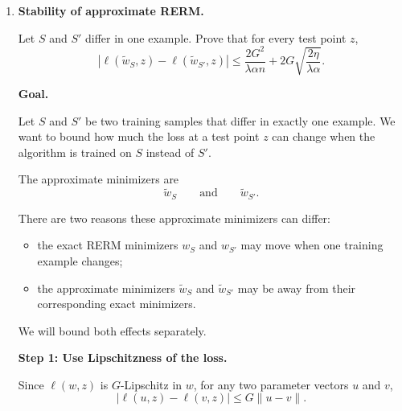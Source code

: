 \documentclass[11pt]{article}
\begin{document}
\begin{enumerate}
\begin{solutionbox}
Subtract \(F_S(w_S)\) from both sides:
\[
\frac{\lambda\alpha}{2}
\|\widetilde w_S-w_S\|^2
\le
\eta.
\]

Multiply both sides by \(\frac{2}{\lambda\alpha}\):
\[
\|\widetilde w_S-w_S\|^2
\le
\frac{2\eta}{\lambda\alpha}.
\]

Taking square roots gives
\[
\boxed{
\|\widetilde w_S-w_S\|
\le
\sqrt{\frac{2\eta}{\lambda\alpha}}
}.
\]

\medskip

\textbf{Interpretation.}

This shows that small optimization error implies small parameter error. Larger \(\lambda\) or larger \(\alpha\) means stronger curvature, so the approximate minimizer must be closer to the exact minimizer.

\end{solutionbox}

\item \textbf{Stability of approximate RERM.}

Let $S$ and $S'$ differ in one example. Prove that for every test point $z$,
\[
|\ell(\widetilde w_S,z)-\ell(\widetilde w_{S'},z)|
\le
\frac{2G^2}{\lambda\alpha n}
+
2G\sqrt{\frac{2\eta}{\lambda\alpha}}.
\]

\begin{solutionbox}

\textbf{Goal.}

Let $S$ and $S'$ be two training samples that differ in exactly one example. We want to bound how much the loss at a test point $z$ can change when the algorithm is trained on $S$ instead of $S'$.

The approximate minimizers are
\[
\widetilde w_S
\qquad \text{and} \qquad
\widetilde w_{S'}.
\]

There are two reasons these approximate minimizers can differ:
\begin{itemize}
    \item the exact RERM minimizers $w_S$ and $w_{S'}$ may move when one training example changes;
    \item the approximate minimizers $\widetilde w_S$ and $\widetilde w_{S'}$ may be away from their corresponding exact minimizers.
\end{itemize}

We will bound both effects separately.

\medskip

\textbf{Step 1: Use Lipschitzness of the loss.}

Since $\ell(w,z)$ is $G$-Lipschitz in $w$, for any two parameter vectors $u$ and $v$,
\[
|\ell(u,z)-\ell(v,z)|
\le
G\|u-v\|.
\]


\end{solutionbox}
\end{enumerate}
\end{document}
